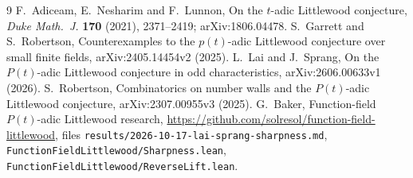 \documentclass[11pt]{amsart}
\theoremstyle{definition}
\theoremstyle{remark}
\begin{document}
\begin{thebibliography}{9}
 F.~Adiceam, E.~Nesharim and F.~Lunnon, On the $t$-adic
Littlewood conjecture, \emph{Duke Math.\ J.} \textbf{170} (2021), 2371--2419;
arXiv:1806.04478.
 S.~Garrett and S.~Robertson, Counterexamples to the $p(t)$-adic
Littlewood conjecture over small finite fields, arXiv:2405.14454v2 (2025).
 L.~Lai and J.~Sprang, On the $P(t)$-adic Littlewood conjecture in
odd characteristics, arXiv:2606.00633v1 (2026).
 S.~Robertson, Combinatorics on number walls and the
$P(t)$-adic Littlewood conjecture, arXiv:2307.00955v3 (2025).
 G.~Baker, Function-field $P(t)$-adic Littlewood research,
\url{https://github.com/solresol/function-field-littlewood}, files
\texttt{results/2026-10-17-lai-sprang-sharpness.md},
\texttt{FunctionFieldLittlewood/Sharpness.lean},
\texttt{FunctionFieldLittlewood/ReverseLift.lean}.
\end{thebibliography}
\end{document}
